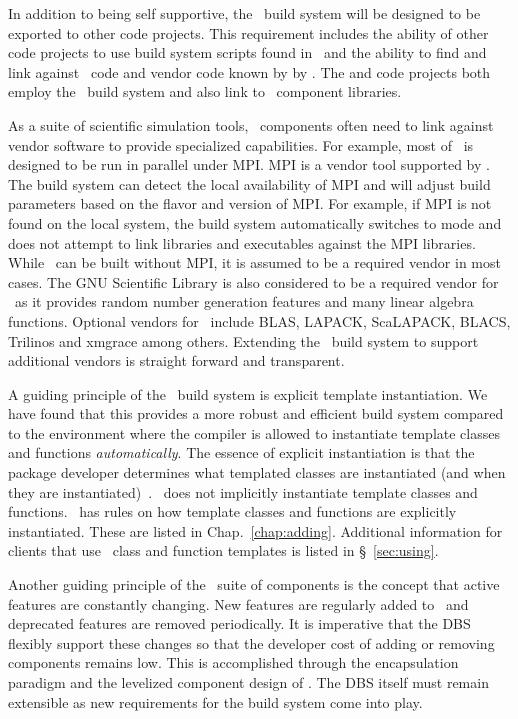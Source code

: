 In addition to being self supportive, the \draco\ build system will be designed to be exported to other code projects.  This requirement includes the ability of other code projects to use build system scripts found in \draco\ and the ability to find and link against \draco\ code and vendor code known by by \draco.  The  and  code projects both employ the \draco\ build system and also link to \draco\ component libraries.

As a suite of scientific simulation tools, \draco\ components often need to link against vendor software to provide specialized capabilities.  For example, most of \draco\ is designed to be run in parallel under MPI.  MPI is a vendor tool supported by \draco.  The build system can detect the local availability of MPI  and will adjust build parameters based on the flavor and version of MPI.  For example, if MPI is not found on the local system, the build system automatically switches to  mode and does not attempt to link libraries and executables against the MPI libraries.  While \draco\ can be built without MPI, it is assumed to be a required vendor in most cases.  The GNU Scientific Library is also considered to be a required vendor for \draco\ as it provides random number generation  features and many linear algebra functions.  Optional vendors for \draco\ include BLAS, LAPACK, ScaLAPACK, BLACS, Trilinos and xmgrace among others.  Extending the \draco\ build system to support additional vendors is straight forward and transparent.

A guiding principle of the \draco\ build system is explicit template
instantiation.   We have found that this provides a  more robust
and efficient build system compared to the environment where the compiler is allowed to
instantiate template classes and functions {\it automatically}.  The essence of explicit
instantiation is that the package developer determines what templated classes
are instantiated (and when they are instantiated)~\cite{cpptemplates}.  \draco\ does not implicitly
instantiate template classes and functions.  \draco\ has rules on how
template classes and functions are explicitly instantiated.  These are
listed in Chap.~\ref{chap:adding}.  Additional information for clients
that use \draco\ class and function templates is listed in
\S~\ref{sec:using}.

Another guiding principle of the \draco\ suite of components is the concept that active features are constantly changing.  New features are regularly added to \draco\ and deprecated features  are removed periodically.  It is imperative that the DBS flexibly support these changes so that the developer cost of adding or removing components remains low.   This is accomplished through the encapsulation paradigm  and the levelized component design of \draco{}.  The DBS itself must remain extensible as new requirements for the build system come into play.

